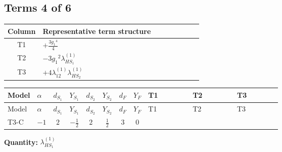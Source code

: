 \documentclass[8pt]{article}
\begin{document}
\begin{landscape}
\subsection*{Terms 4 of 6}
\begin{center}
\begin{tabular}{@{}c >{\raggedright\arraybackslash}p{0.82\linewidth}@{}}
\toprule
Column & Representative term structure \\
\midrule
T1 & \(\displaystyle +\frac{3 {g_1}^4}{4}\) \\
\midrule
T2 & \(\displaystyle -3 {g_1}^2 {\lambda_{HS_1}^{(1)}}\) \\
\midrule
T3 & \(\displaystyle +4 {\lambda_{12}^{(1)}} {\lambda_{HS_2}^{(1)}}\) \\
\midrule
\bottomrule
\end{tabular}
\end{center}
\smallskip
\tiny
\begin{longtable}{@{}llcccccc >{\raggedright\arraybackslash}p{0.21\linewidth} >{\raggedright\arraybackslash}p{0.21\linewidth} >{\raggedright\arraybackslash}p{0.21\linewidth}@{}}
\toprule
Model & $\alpha$ & $d_{S_1}$ & $Y_{S_1}$ & $d_{S_2}$ & $Y_{S_2}$ & $d_F$ & $Y_F$ & T1 & T2 & T3 \\
\midrule
\endfirsthead
\toprule
Model & $\alpha$ & $d_{S_1}$ & $Y_{S_1}$ & $d_{S_2}$ & $Y_{S_2}$ & $d_F$ & $Y_F$ & T1 & T2 & T3 \\
\midrule
\endhead
T3-C & $-1$ & $2$ & $-\frac{1}{2}$ & $2$ & $\frac{1}{2}$ & $3$ & $0$ & \scriptsize\adjustbox{max width=\linewidth}{$\begin{gathered} +\frac{3 {g_1}^4}{4}\end{gathered}$} & \scriptsize\adjustbox{max width=\linewidth}{$\begin{gathered} -3 {g_1}^2 {\lambda_{HS_1}^{(1)}}\end{gathered}$} & \scriptsize\adjustbox{max width=\linewidth}{$\begin{gathered} +4 {\lambda_{12}^{(1)}} {\lambda_{HS_2}^{(1)}}\end{gathered}$} \\
\midrule
\bottomrule
\end{longtable}
\clearpage
\noindent\textbf{Quantity: }$\lambda_{HS_1}^{(1)}$\par\smallskip

\end{landscape}
\end{document}
